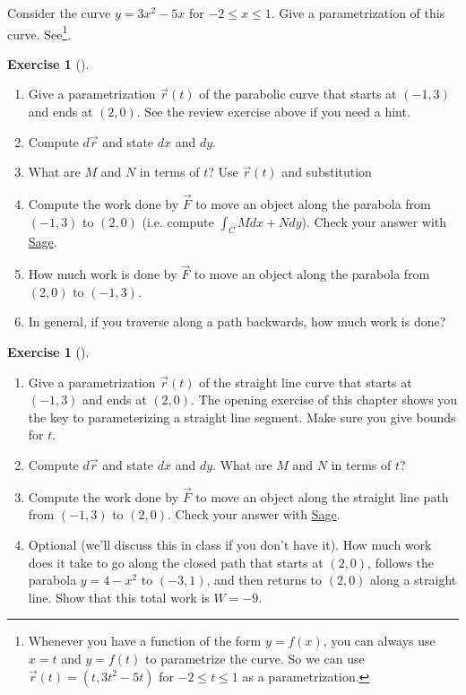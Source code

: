 \documentclass[10pt,]{book}
\theoremstyle{plain}
\theoremstyle{definition}
\theoremstyle{definition}
\theoremstyle{definition}
\theoremstyle{definition}
\newtheorem{exploration}[project]{Exercise}
\theoremstyle{definition}
\numberwithin{equation}{section}
\newcommand{\sageworkurl}{http://bmw.byuimath.com/dokuwiki/doku.php?id=work_calculator}
\begin{document}
Consider the curve \(y=3x^2-5x\) for \(-2\leq x\leq 1\). Give a parametrization of this curve. See\footnote{Whenever you have a function of the form \(y=f(x)\), you can always use \(x=t\) and \(y=f(t)\) to parametrize the curve.  So we can use \(\vec r(t) = (t, 3t^2-5t)\) for \(-2\leq t\leq 1\) as a parametrization.\label{fn-18}}.%
\begin{exploration}[]\label{exploration-192}
\leavevmode%
\begin{enumerate}[font=\bfseries,label=(\alph*),ref=\alph*]
\item\label{task-474} Give a parametrization \(\vec r(t)\) of the parabolic curve that starts at \((-1,3)\) and ends at \((2,0)\).  See the review exercise above if you need a hint.%
\item\label{task-475} Compute \(d\vec r\) and state \(dx\) and \(dy\).%
\item\label{task-476} What are \(M\) and \(N\) in terms of \(t\)? Use \(\vec r (t)\) and substitution%
%
\item\label{task-477} Compute the work done by \(\vec F\) to move an object along the parabola from \((-1,3)\) to \((2,0)\) (i.e. compute \(\int _C Mdx+Ndy\)). Check your answer with \href{\\sageworkurl}{Sage}.%
\item\label{task-478} How much work is done by \(\vec F\) to move an object along the parabola from \((2,0)\) to \((-1,3)\).%
\item\label{task-479} In general, if you traverse along a path backwards, how much work is done?%
\end{enumerate}
\end{exploration}
\begin{exploration}[]\label{exploration-193}
\leavevmode%
\begin{enumerate}[font=\bfseries,label=(\alph*),ref=\alph*]
\item\label{task-480} Give a parametrization \(\vec r(t)\) of the straight line curve that starts at \((-1,3)\) and ends at \((2,0)\). The opening exercise of this chapter shows you the key to parameterizing a straight line segment.  Make sure you give bounds for \(t\).%
\item\label{task-481} Compute \(d\vec r\) and state \(dx\) and \(dy\). What are \(M\) and \(N\) in terms of \(t\)?%
\item\label{task-482} Compute the work done by \(\vec F\) to move an object along the straight line path from \((-1,3)\) to \((2,0)\). Check your answer with \href{\\sageworkurl}{Sage}.  %
\item\label{task-483} Optional (we'll discuss this in class if you don't have it).  How much work does it take to go along the closed path that starts at \((2,0)\), follows the parabola \(y=4-x^2\) to \((-3,1)\), and then returns to \((2,0)\) along a straight line. Show that this total work is \(W=-9\).%
\end{enumerate}
\end{exploration}
\end{document}

